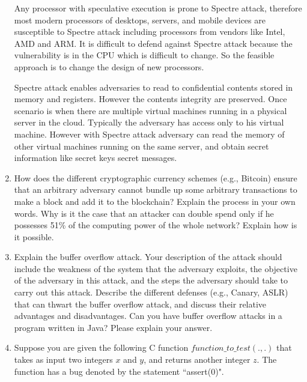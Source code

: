 \documentclass[12pt,a4paper]{article}
\begin{document}
\begin{enumerate}
Any processor with speculative execution is prone to Spectre attack, therefore most modern processors of desktops, servers, and mobile devices are susceptible to Spectre attack including processors from vendors like Intel, AMD and ARM. It is difficult to defend against Spectre attack because the vulnerability is in the CPU which is difficult to change. So the feasible approach is to change the design of new processors. 

Spectre attack enables adversaries to  read to confidential contents stored in memory and registers. However the contents integrity are preserved. Once scenario is when there are multiple virtual machines running in a physical server in the cloud. Typically the adversary has access only to his virtual machine. However with Spectre attack adversary can read the memory of other virtual machines running on the same server, and obtain secret information like secret keys secret messages. 
\color{black}

\item How does the different cryptographic currency schemes (e.g., Bitcoin) ensure
that an arbitrary adversary cannot bundle up some arbitrary transactions to make a
block and add it to the blockchain? Explain the process in your own words. Why is it
the case that an attacker can double spend only if he possesses 51\% of the computing
power of the whole network? Explain how is it possible.


\color{blue}


\color{black}

\item Explain the buffer overflow attack. Your description of the attack should
include the weakness of the system that the adversary exploits, the objective of the
adversary in this attack, and the steps the adversary should take to carry out this
attack. Describe the different defenses (e.g., Canary, ASLR) that can thwart the buffer overflow attack, and discuss their relative advantages and disadvantages. Can you have buffer overflow attacks in a program written in Java? Please explain your answer.


\color{blue}

\color{black}

\item Suppose you are given the following C function $function\_to\_test (.,.)$ that
takes as input two integers $x$ and $y$, and returns another integer $z$. The function has a
bug denoted by the statement ``assert(0)".


\end{enumerate}
\end{document}
